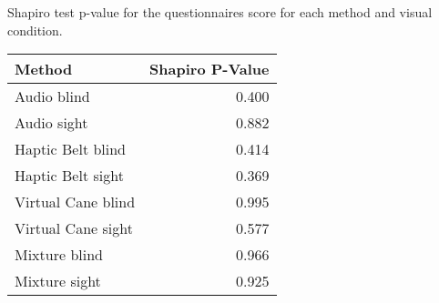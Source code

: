 
\centering
\caption{Shapiro test p-value for the questionnaires score for each method and visual condition.}
\label{tab:shapiro_questionnaires}
\begin{tabular}{lr}
\toprule
            Method &  Shapiro P-Value \\
\midrule
       Audio blind &            0.400 \\
       Audio sight &            0.882 \\
 Haptic Belt blind &            0.414 \\
 Haptic Belt sight &            0.369 \\
Virtual Cane blind &            0.995 \\
Virtual Cane sight &            0.577 \\
     Mixture blind &            0.966 \\
     Mixture sight &            0.925 \\
\bottomrule
\end{tabular}
